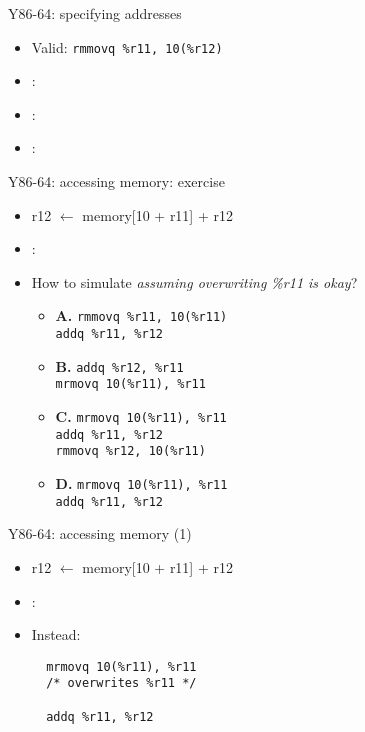 \begin{frame}[label=Y86memory1,fragile]{Y86-64: specifying addresses}
\begin{itemize}
\item Valid: \lstinline|rmmovq %r11, 10(%r12)|
\item<2-> :  
\item<2-> :  
\item<2-> :  
\end{itemize}
\end{frame}

\begin{frame}[label=Y86memory2Ex,fragile]{Y86-64: accessing memory: exercise}
\begin{itemize}
\item r12 $\leftarrow$ memory[10 + r11] + r12
\item {}:  
\item How to simulate \textit{assuming overwriting \%r11 is okay}?
\begin{itemize}
\item \textbf{A.} \texttt{rmmovq \%r11, 10(\%r11)} \\ \texttt{addq \%r11, \%r12}
\item \textbf{B.} \texttt{addq \%r12, \%r11} \\ \texttt{mrmovq 10(\%r11), \%r11}
\item \textbf{C.} \texttt{mrmovq 10(\%r11), \%r11} \\ \texttt{addq \%r11, \%r12} \\ \texttt{rmmovq \%r12, 10(\%r11)}
\item \textbf{D.} \texttt{mrmovq 10(\%r11), \%r11} \\ \texttt{addq \%r11, \%r12}
\end{itemize}
\end{itemize}
\end{frame}


\begin{frame}[label=Y86memory2Soln,fragile]{Y86-64: accessing memory (1)}
\begin{itemize}
\item r12 $\leftarrow$ memory[10 + r11] + r12
\item {}:  \\
\item<2-> Instead:
\begin{lstlisting}
  mrmovq 10(%r11), %r11
  /* overwrites %r11 */

  addq %r11, %r12
\end{lstlisting}
\end{itemize}
\end{frame}

